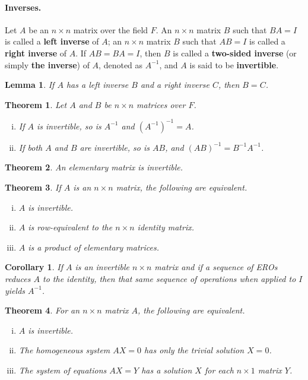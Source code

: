 \documentclass{article}
\newtheorem{theorem}{Theorem}
\newtheorem*{corollary*}{Corollary}
\newtheorem*{lemma*}{Lemma}
\begin{document}
\paragraph{Inverses.} Let $A$ be an $n \times n$ matrix over the field $F$. An
$n \times n$ matrix $B$ such that $BA = I$ is called a \textbf{left inverse} of
$A$; an $n \times n$ matrix $B$ such that $AB = I$ is called a \textbf{right
inverse} of $A$. If $AB = BA = I$, then $B$ is called a \textbf{two-sided
inverse} (or simply \textbf{the inverse}) of $A$, denoted as $A^{-1}$, and $A$
is said to be \textbf{invertible}.

\begin{lemma*}
  If $A$ has a left inverse $B$ and a right inverse $C$, then $B = C$.
\end{lemma*}

\begin{theorem}
  Let $A$ and $B$ be $n \times n$ matrices over $F$.
  \begin{enumerate}[(i)]
    \item If $A$ is invertible, so is $A^{-1}$ and $(A^{-1})^{-1} = A$.
    \item If both $A$ and $B$ are invertible, so is $AB$, and $(AB)^{-1} =
      B^{-1}A^{-1}$.
  \end{enumerate}
\end{theorem}

\begin{theorem}
  An elementary matrix is invertible.
\end{theorem}

\begin{theorem}
  If $A$ is an $n \times n$ matrix, the following are equivalent.
  \begin{enumerate}[(i)]
    \item $A$ is invertible.
    \item $A$ is row-equivalent to the $n \times n$ identity matrix.
    \item $A$ is a product of elementary matrices.
  \end{enumerate}
\end{theorem}

\begin{corollary*}
  If $A$ is an invertible $n \times n$ matrix and if a sequence of EROs reduces
  $A$ to the identity, then that same sequence of operations when applied to $I$
  yields $A^{-1}$.
\end{corollary*}

\begin{theorem}
  For an $n \times n$ matrix $A$, the following are equivalent.
  \begin{enumerate}[(i)]
    \item $A$ is invertible.
    \item The homogeneous system $AX = 0$ has only the trivial solution $X = 0$.
    \item The system of equations $AX = Y$ has a solution $X$ for each $n \times
      1$ matrix $Y$.
  \end{enumerate}
\end{theorem}
\end{document}
